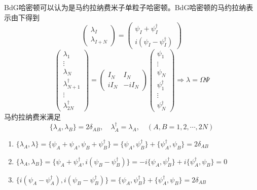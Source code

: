 \documentclass[a4paper]{article}
\numberwithin{equation}{subsection}
\begin{document}
BdG哈密顿可以认为是马约拉纳费米子单粒子哈密顿。BdG哈密顿的马约拉纳表示由下得到
\begin{equation}
    \begin{pmatrix}
        \lambda_I\\
        \lambda_{I+N}
    \end{pmatrix}=\begin{pmatrix}
        \psi_I+\psi_I^\dagger\\
        i(\psi_I-\psi_I^\dagger)
    \end{pmatrix}
\end{equation}
\begin{equation}
    \begin{pmatrix}
        \lambda_1\\
        \vdots\\
        \lambda_N\\
        \lambda_{N+1}^\dagger\\
        \vdots\\
        \lambda_{2N}^\dagger
    \end{pmatrix}=\begin{pmatrix}
        I_N&I_N\\
        iI_N&-iI_N
    \end{pmatrix}\begin{pmatrix}
        \psi_1\\
        \vdots\\
        \psi_N\\
        \psi_1^\dagger\\
        \vdots\\
        \psi_N^\dagger
    \end{pmatrix}\Rightarrow \lambda=\Omega\Psi
\end{equation}
马约拉纳费米满足
\begin{equation}
    \{\lambda_A,\lambda_B\}=2\delta_{AB},\quad\lambda_A^\dagger=\lambda_A,\quad (A,B=1,2,\cdots,2N)
\end{equation}
\begin{enumerate}
    \item $\{\lambda_A,\lambda\}=\{\psi_A+\psi_A,\psi_B+\psi_B^\dagger\}=\{\psi_A,\psi_B^\dagger\}+\{\psi_A^\dagger,\psi_B\}=2\delta_{AB}$
    \item $\{\lambda_A,\lambda_B\}=\{\psi_A+\psi_A^\dagger,i(\psi_B-\psi_B^\dagger)\}=-i\{\psi_A,\psi_B^\dagger\}+i\{\psi_A^\dagger,\psi_B\}=0$
    \item $\{i(\psi_A-\psi_A^\dagger),i(\psi_B-\psi_B^\dagger)\}=\{\psi_A,\psi_B^\dagger\}+\{\psi_A^\dagger,\psi_B\}=2\delta_{AB}$
\end{enumerate}
\end{document}
